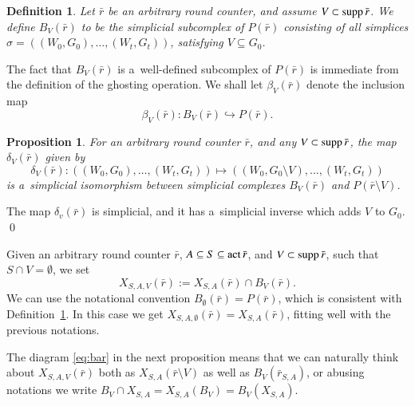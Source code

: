 \documentclass{amsart}[10pt]
\newtheorem{df}[theorem]{Definition}
\newtheorem{prop}[theorem]{Proposition}
\newcommand{\pr}{\nin{\bf Proof.} }
\newcommand{\act}{\text{\rm act}\,}
\newcommand{\es}{\emptyset}
\newcommand{\sm}{\setminus}
\newcommand{\supp}{\text{\rm supp}\,}
\newcommand{\tr}{{\bar r}}
\numberwithin{equation}{section}
\numberwithin{figure}{section}
\numberwithin{table}{section}
\begin{document}
\begin{df}\label{df:bv}
Let $\tr$ be an arbitrary round counter, and assume
$V\subset\supp\tr$. We define $B_V(\tr)$ to be the simplicial
subcomplex of $P(\tr)$ consisting of all simplices
$\sigma=((W_0,G_0),\dots,\allowbreak (W_t,G_t))$, satisfying
$V\subseteq G_0$.
\end{df}

The fact that $B_V(\tr)$ is a~well-defined subcomplex of $P(\tr)$ is
immediate from the definition of the ghosting operation. We shall
let $\beta_V(\tr)$ denote the inclusion map
\[\beta_V(\tr):B_V(\tr)\hookrightarrow P(\tr).\]

\begin{prop}
For an arbitrary round counter $\tr$, and any $V\subset\supp\tr$, the map
$\delta_V(\tr)$ given by
\[\delta_V(\tr):((W_0,G_0),\dots,(W_t,G_t))\mapsto((W_0,G_0\sm V),\dots,(W_t,G_t))\]
is a~simplicial isomorphism between simplicial complexes $B_V(\tr)$
and $P(\tr\sm V)$.
\end{prop}
\pr The map $\delta_v(\tr)$ is simplicial, and it has a~simplicial
inverse which adds $V$ to $G_0$.  \qed

\vskip5pt

Given an arbitrary round counter $\tr$, $A\subseteq
S\subseteq\act\tr$, and $V\subset\supp\tr$, such that $S\cap V=\es$,
we set \[X_{S,A,V}(\tr):=X_{S,A}(\tr)\cap B_V(\tr).\] We can use the
notational convention $B_\es(\tr)=P(\tr)$, which is consistent with
Definition~\ref{df:bv}. In this case we get
$X_{S,A,\es}(\tr)=X_{S,A}(\tr)$, fitting well with the previous
notations.

The diagram \eqref{eq:bar} in the next proposition means that we can
naturally think about $X_{S,A,V}(\tr)$ both as $X_{S,A}(\tr\sm V)$ as
well as $B_V(\tr_{S,A})$, or abusing notations we write $B_V\cap
X_{S,A}=X_{S,A}(B_V)=B_V(X_{S,A})$.
\end{document}
